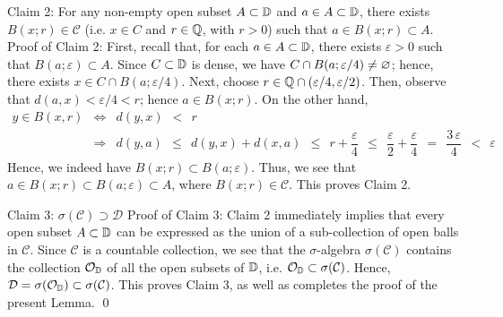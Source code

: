 \vskip 0.5cm
\noindent
Claim 2:\;\; For any non-empty open subset $A \subset \mathbb{D}$ and $a \in A \subset \mathbb{D}$,
there exists $B(x;r) \in \mathcal{C}$ (i.e. $x \in C$ and $r \in \mathbb{Q}$, with $r > 0$)
such that $a \in B(x;r) \subset A$.
\vskip 0.1cm
\noindent
Proof of Claim 2:\; First, recall that, for each $a \in A \subset \mathbb{D}$,
there exists $\varepsilon > 0$ such that $B(a;\varepsilon) \subset A$.
Since $C \subset \mathbb{D}$ is dense, we have $C \cap B(a;\varepsilon/4) \neq \varnothing$;
hence, there exists $x \in C \cap B(a;\varepsilon/4)$.
Next, choose $r \in \mathbb{Q} \cap (\varepsilon/4,\varepsilon/2)$.
Then, observe that $d(a,x) < \varepsilon/4 < r$; hence $a \in B(x;r)$.
On the other hand,
\begin{eqnarray*}
y \in B(x,r)
& \Longleftrightarrow &
	d(y,x) \;\, < \;\, r
\\
& \Longrightarrow &
	d(y,a)
	\,\;\leq\;\, d(y,x) + d(x,a)
	\,\;\leq\;\, r + \dfrac{\varepsilon}{4}
	\,\;\leq\;\, \dfrac{\varepsilon}{2} + \dfrac{\varepsilon}{4}
	\,\;=\;\, \dfrac{3\,\varepsilon}{4}
	\,\;<\;\, \varepsilon
\end{eqnarray*}
Hence, we indeed have $B(x;r) \subset B(a;\varepsilon)$.
Thus, we see that $a \in B(x;r) \subset B(a;\varepsilon) \subset A$,
where $B(x;r) \in \mathcal{C}$.
This proves Claim 2.

\vskip 0.5cm
\noindent
Claim 3:\;\; $\sigma(\mathcal{C}) \supset \mathcal{D}$
\vskip 0.1cm
\noindent
Proof of Claim 3:\; Claim 2 immediately implies that every open subset $A \subset \mathbb{D}$
can be expressed as the union of a sub-collection of open balls in $\mathcal{C}$.
Since $\mathcal{C}$ is a countable collection, we see that
the $\sigma$-algebra $\sigma(\mathcal{C})$ contains the collection $\mathcal{O}_{\mathbb{D}}$ 
of all the open subsets of $\mathbb{D}$, i.e. $\mathcal{O}_{\mathbb{D}} \subset \sigma(\mathcal{C})$.
Hence, $\mathcal{D} = \sigma(\mathcal{O}_{\mathbb{D}}) \subset \sigma(\mathcal{C})$.
This proves Claim 3, as well as completes the proof of the present Lemma.
\qed


\renewcommand{\theenumi}{\roman{enumi}}
\renewcommand{\labelenumi}{\textnormal{(\theenumi)}$\;\;$}

